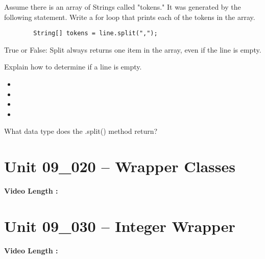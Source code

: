 \documentclass[letterpaper,12pt]{exam}
\newcommand{\unit}{Unit 09}
\begin{document}
\begin{questions}
\begin{samepage}
    \question Assume there is an array of Strings called "tokens."  It was generated by the following statement.  Write a for loop that prints each of the tokens in the array.
    \begin{verbatim}
        String[] tokens = line.split(",");
    \end{verbatim}
        
    \vspace{15mm}
\end{samepage}

\begin{samepage}
    \question True or False:  Split always returns one item in the array, even if the line is empty.
    \vspace{5mm}
\end{samepage}

\begin{samepage}
    \question Explain how to determine if a line is empty.
      \begin{itemize}
        \item 
        \vspace{5mm}
        \item 
        \vspace{5mm}
        \item 
        \vspace{5mm}
        \item 
        \vspace{5mm}
       \end{itemize}
\end{samepage}



\begin{samepage}
    \question What data type does the .split() method return?
    \vspace{5mm}
\end{samepage}


\section*{\unit\_020 -- Wrapper Classes } 
\par{\selectfont\textbf{Video Length :}}

\section*{\unit\_030 -- Integer Wrapper} 
\par{\selectfont\textbf{Video Length :}}


\end{questions}
\end{document}
